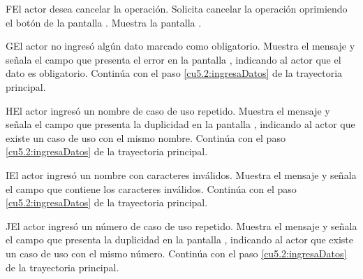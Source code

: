  \begin{UCtrayectoriaA}{F}{El actor desea cancelar la operación.}
    \UCpaso[\UCactor] Solicita cancelar la operación oprimiendo el botón  de la pantalla .
    \UCpaso[\UCsist] Muestra la pantalla .
 \end{UCtrayectoriaA}
 \begin{UCtrayectoriaA}{G}{El actor no ingresó algún dato marcado como obligatorio.}
    \UCpaso[\UCsist] Muestra el mensaje  y señala el campo que presenta el error en la pantalla 
	    , indicando al actor que el dato es obligatorio.
    \UCpaso[] Continúa con el paso \ref{cu5.2:ingresaDatos} de la trayectoria principal.
 \end{UCtrayectoriaA}
 \begin{UCtrayectoriaA}{H}{El actor ingresó un nombre de caso de uso repetido.}
    \UCpaso[\UCsist] Muestra el mensaje  y señala el campo que presenta la duplicidad en la pantalla 
	    , indicando al actor que existe un caso de uso con el mismo nombre.
    \UCpaso[] Continúa con el paso \ref{cu5.2:ingresaDatos} de la trayectoria principal.
 \end{UCtrayectoriaA}
 \begin{UCtrayectoriaA}{I}{El actor ingresó un nombre con caracteres inválidos.}
    \UCpaso[\UCsist] Muestra el mensaje  y señala el campo que contiene los caracteres inválidos.
    \UCpaso[] Continúa con el paso \ref{cu5.2:ingresaDatos} de la trayectoria principal.
 \end{UCtrayectoriaA}
 \begin{UCtrayectoriaA}{J}{El actor ingresó un número de caso de uso repetido.}
    \UCpaso[\UCsist] Muestra el mensaje  y señala el campo que presenta la duplicidad en la pantalla 
	    , indicando al actor que existe un caso de uso con el mismo número.
    \UCpaso[] Continúa con el paso \ref{cu5.2:ingresaDatos} de la trayectoria principal.
 \end{UCtrayectoriaA}
